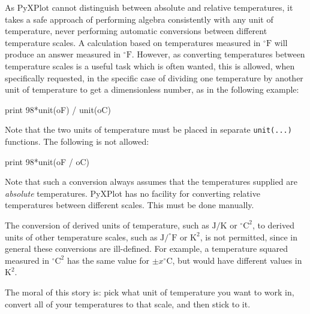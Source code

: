 As PyXPlot cannot distinguish between absolute and relative temperatures, it
takes a safe approach of performing algebra consistently with any unit of
temperature, never performing automatic conversions between different
temperature scales. A calculation based on temperatures measured in
$^\circ\mathrm{F}$ will produce an answer measured in $^\circ\mathrm{F}$.
However, as converting temperatures between temperature scales is a useful task
which is often wanted, this is allowed, when specifically requested, in the
specific case of dividing one temperature by another unit of temperature to get
a dimensionless number, as in the following example:

\begin{dodo}
print 98*unit(oF) / unit(oC)
\end{dodo}

\noindent Note that the two units of temperature must be placed in separate
{\tt unit(...)} functions. The following is not allowed:

\begin{dontdo}
print 98*unit(oF / oC)
\end{dontdo}

Note that such a conversion always assumes that the temperatures supplied are
{\it absolute} temperatures. PyXPlot has no facility for converting relative
temperatures between different scales. This must be done manually.

The conversion of derived units of temperature, such as $\mathrm{J}/\mathrm{K}$ or
$^\circ\mathrm{C}^2$, to derived units of other temperature scales, such as
$\mathrm{J}/^\circ\mathrm{F}$ or $\mathrm{K}^2$, is not permitted, since in
general these conversions are ill-defined. For example, a temperature squared
measured in $^\circ\mathrm{C}^2$ has the same value for $\pm
x^\circ\mathrm{C}$, but would have different values in $\mathrm{K}^2$.

The moral of this story is: pick what unit of temperature you want to work in,
convert all of your temperatures to that scale, and then stick to it.


